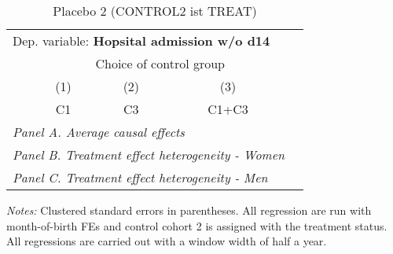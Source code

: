  \begin{table}[H] \centering \begin{threeparttable} \caption{Placebo 2 (CONTROL2 ist TREAT) } {\def\sym#1{\ifmmode^{#1}\else\(^{#1}\)\fi} \begin{tabular}{l*{4}{c}} \toprule \multicolumn{4}{l}{Dep. variable: \textbf{Hopsital admission w/o d14}} \\ & \multicolumn{3}{c}{Choice of control group} \\ \cmidrule(lr){2-4}
            &\multicolumn{1}{c}{(1)}&\multicolumn{1}{c}{(2)}&\multicolumn{1}{c}{(3)}\\
            &\multicolumn{1}{c}{C1}&\multicolumn{1}{c}{C3}&\multicolumn{1}{c}{C1+C3}\\
\midrule
 \multicolumn{4}{l}{\emph{Panel A. Average causal effects}} \\      \midrule\multicolumn{4}{l}{\emph{Panel B. Treatment effect heterogeneity - Women}} \\      \midrule\multicolumn{4}{l}{\emph{Panel C. Treatment effect heterogeneity - Men}} \\      
\bottomrule \end{tabular} } \begin{tablenotes} \item \scriptsize \emph{Notes:} Clustered standard errors in parentheses. All regression are run with month-of-birth FEs and control cohort 2 is assigned with the treatment status. All regressions are carried out with a window width of half a year. \end{tablenotes} \end{threeparttable} \end{table} 
